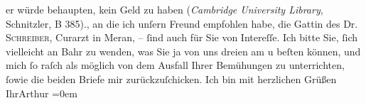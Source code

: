 \begin{ledgroupsized}[t]{13cm}
{{{                  er würde behaupten, kein Geld zu haben (\emph{Cambridge University Library}, Schnitzler, B
                  385).}}}\label{K_L00199-2h}, an die ich unſern Freund empfohlen habe, die Gattin des Dr.
                  \textsc{Schreiber}, Curarzt in Meran, – ſind auch für Sie
               von Intereſſe. Ich bitte Sie, ſich vielleicht an Bahr zu wenden, was Sie ja von uns dreien am \label{K_L00199-3v}\label{K_L00199-3h}
               u beſten können, {\pb}und mich ſo raſch als möglich von dem
               Ausfall Ihrer Bemühungen zu unterrichten, ſowie die beiden Briefe mir
               zurückzuſchicken.\pend
           \pstart
           Ich bin mit herzlichen Grüßen{\\[\baselineskip]}Ihr\spacefill\mbox{Arthur}\pend
           \leftskip=0em{}
         
         \endnumbering{}\end{ledgroupsized}  \newcommand{\dateiname}{L00199}\newcommand{\titel}{Arthur Schnitzler an Hugo von Hofmannsthal, [21. 4. 1893?]}\newcommand{\editorInnen}{ Martin Anton Müller und Gerd-Hermann Susen}
      